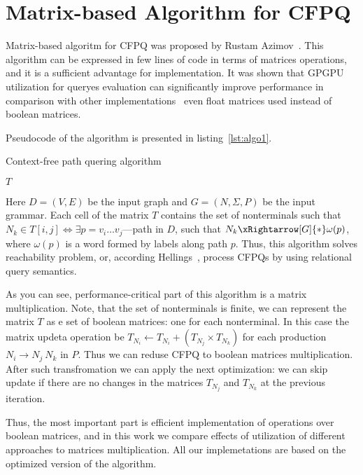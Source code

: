 \section{Matrix-based Algorithm for CFPQ}

Matrix-based algoritm for CFPQ was proposed by Rustam Azimov~\cite{Azimov:2018:CPQ:3210259.3210264}.
This algorithm can be expressed in few lines of code in terms of matrices operations, and it is a sufficient advantage for implementation.
It was shown that GPGPU utilization for queryes evaluation can significantly improve performance in comparison with other implementations~\cite{Azimov:2018:CPQ:3210259.3210264} even float matrices used instead of boolean matrices.

Pseudocode of the algorithm is presented in listing~\ref{lst:algo1}.

\begin{algorithm}[H]
\begin{algorithmic}[1]
\caption{Context-free path quering algorithm}
\label{lst:algo1}
    
    \EndFor    
       
    \EndWhile
\State \Return $T$
\EndFunction
\end{algorithmic}
\end{algorithm}

Here $D = (V, E)$ be the input graph and $G = (N,\Sigma,P)$ be the input grammar. 
Each cell of the matrix $T$ contains the set of nonterminals such that $N_k \in T[i,j] \iff \exists p = v_i \ldots v_j $---path in $D$, such that $N_k \xRightarrow[G]{*} \omega(p) $, where $\omega(p)$ is a word formed by labels along path $p$.
Thus, this algorithm solves reachability problem, or, according Hellings~\cite{hellingsRelational}, process CFPQs by using relational query semantics.

As you can see, performance-critical part of this algorithm is a matrix multiplication.
Note, that the set of nonterminals is finite, we can represent the matrix $T$ as e set of boolean matrices: one for each nonterminal.
In this case the matrix updeta operation be $T_{N_i} \leftarrow T_{N_i} + (T_{N_j} \times T_{N_k})$ for each production $N_i \rightarrow N_j \ N_k$ in $P$.
Thus we can reduse CFPQ to boolean matrices multiplication. 
After such transfromation we can apply the next optimization: we can skip update if there are no changes in the matrices $T_{N_j}$ and $T_{N_k}$ at the previous iteration.

Thus, the most important part is efficient implementation of operations over boolean matrices, and in this work we compare effects of utilization of different approaches to matrices multiplication.
All our implemetations are based on the optimized version of the algorithm.
